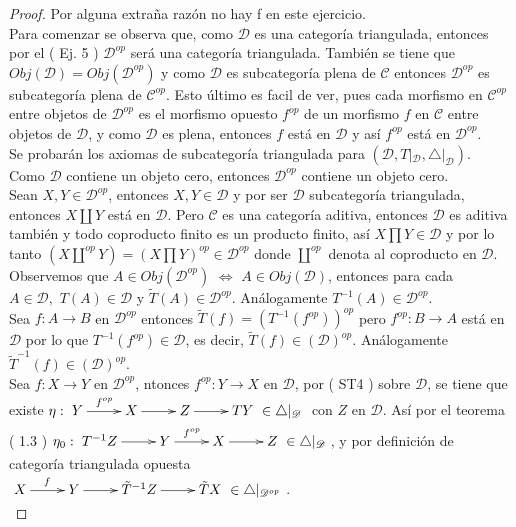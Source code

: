\documentclass{article}
\begin{document}
\begin{enumerate}
\begin{proof}
 Por alguna extraña razón no hay f en este ejercicio.\\

 Para comenzar se observa que, como $\mathscr{D}$ es una categoría triangulada, entonces por el ( Ej. 5 )  $\mathscr{D}^{op}$ 
será una categoría triangulada. También se tiene que $Obj(\mathscr{D})=Obj(\mathscr{D}^{op})$ y como $\mathscr{D}$ es subcategoría plena de 
$\mathscr{C}$ entonces $\mathscr{D}^{op}$ es subcategoría plena de $\mathscr{C}^{op}$. Esto último es facil de ver, pues cada morfismo en 
$\mathscr{C}^{op}$ entre objetos de $\mathscr{D}^{op}$ es el morfismo opuesto $f^{op}$ de un morfismo $f$ en $\mathscr{C}$ entre objetos de
$\mathscr{D}$, y como $\mathscr{D}$ es plena, entonces $f$ está en $\mathscr{D}$ y así $f^{op}$ está en $\mathscr{D}^{op}$.\\

Se probarán los axiomas de subcategoría triangulada para $(\mathscr{D},T|_\mathscr{D},\triangle|_\mathscr{D})$.\\

 Como $\mathscr{D}$ contiene un objeto cero, entonces $\mathscr{D}^{op}$ contiene un objeto cero.\\

 Sean $X,Y\in\mathscr{D}^{op}$, entonces $X,Y\in\mathscr{D}$ y por ser $\mathscr{D}$ subcategoría triangulada, entonces $X\coprod Y$ 
está en $\mathscr{D}$. Pero $\mathscr{C}$ es una categoría aditiva, entonces $\mathscr{D}$ es aditiva también y todo coproducto finito es un producto 
finito, así $X\prod Y\in \mathscr{D}$ y por lo tanto $\left(X\coprod^{op} Y\right)=\left(X\prod Y\right)^{op}\in \mathscr{D}^{op}$ donde 
$\coprod^{op}$ denota al coproducto en $\mathscr{D}$.\\

 Observemos que $ A\in Obj(\mathscr{D}^{op})\,\,\iff\,\, A\in Obj(\mathscr{D})$, entonces para cada $A\in \mathscr{D}, \,\,
T(A)\in \mathscr{D}$ y $\tilde{T}(A)\in \mathscr{D}^{op}$. Análogamente $T^{-1}(A)\in \mathscr{D}^{op}$.\\

Sea $f:A\to B$ en $\mathscr{D}^{op}$ entonces $\tilde{T}(f)=(T^{-1}(f^{op}))^{op}$ pero $f^{op}:B\to A$ está en $\mathscr{D}$ por lo que
$T^{-1}(f^{op})\in \mathscr{D}$, es decir, $\tilde{T}(f)\in (\mathscr{D})^{op}$. Análogamente $\tilde{T}^{-1}(f)\in (\mathscr{D})^{op}$.\\

 Sea $f:X\to Y$ en $\mathscr{D}^{op}$, ntonces $f^{op}:Y\to X$ en $\mathscr{D}$, por ( ST4 ) sobre $\mathscr{D}$, se tiene que
existe $\eta:\xymatrix{Y\ar[r]^{f^{op}}&X\ar[r]&Z\ar[r]&TY\,\,\in \triangle|_{\mathscr{D}}}$ con $Z$ en $\mathscr{D}$. Así por el teorema ( 1.3 ) 
$\eta_0:\xymatrix{T^{-1}Z\ar[r]&Y\ar[r]^{f^{op}}&X\ar[r]&Z\,\,\in \triangle|_{\mathscr{D}}}$, y por definición de categoría triangulada opuesta\\
$\xymatrix{X\ar[r]^f&Y\ar[r]&\tilde{T}^{-1}Z\ar[r]&\tilde{T}X\,\,\in \triangle|_{\mathscr{D}^{op}}}$.\\


\end{proof}
\end{enumerate}
\end{document}
